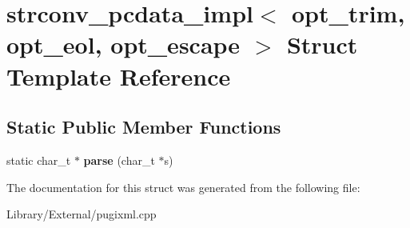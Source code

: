 \hypertarget{structstrconv__pcdata__impl}{}\section{strconv\+\_\+pcdata\+\_\+impl$<$ opt\+\_\+trim, opt\+\_\+eol, opt\+\_\+escape $>$ Struct Template Reference}
\label{structstrconv__pcdata__impl}
\subsection*{Static Public Member Functions}
\begin{DoxyCompactItemize}
\item 
\hypertarget{structstrconv__pcdata__impl_a0bd2c80c1df06c93d77332a4bb63b5b8}{}static char\+\_\+t $\ast$ {\bfseries parse} (char\+\_\+t $\ast$s)\label{structstrconv__pcdata__impl_a0bd2c80c1df06c93d77332a4bb63b5b8}

\end{DoxyCompactItemize}


The documentation for this struct was generated from the following file\+:\begin{DoxyCompactItemize}
\item 
Library/\+External/pugixml.\+cpp\end{DoxyCompactItemize}
